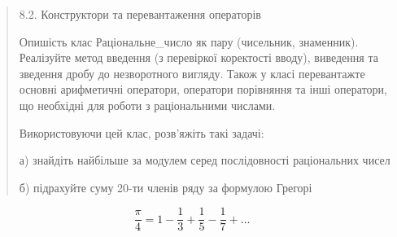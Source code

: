 \documentclass[]{article}
\begin{document}
\begin{quote}
8.2. Конструктори та перевантаження операторів

\protect\hypertarget{_Hlk65950735}{}{}Опишість клас Раціональне\_число
як пару (чисельник, знаменник). Реалізуйте метод введення (з перевіркої
коректості вводу), виведення та зведення дробу до незворотного вигляду.
Також у класі перевантажте основні арифметичні оператори, оператори
порівняння та інші оператори, що необхідні для роботи з раціональними
числами.

Використовуючи цей клас, розв'яжіть такі задачі:

а) знайдіть найбільше за модулем серед послідовності раціональних чисел

б) підрахуйте суму 20-ти членів ряду за формулою Грегорі
\end{quote}

\[\frac{\pi}{4} = 1 - \frac{1}{3} + \frac{1}{5} - \frac{1}{7} + \ldots\]
\end{document}
